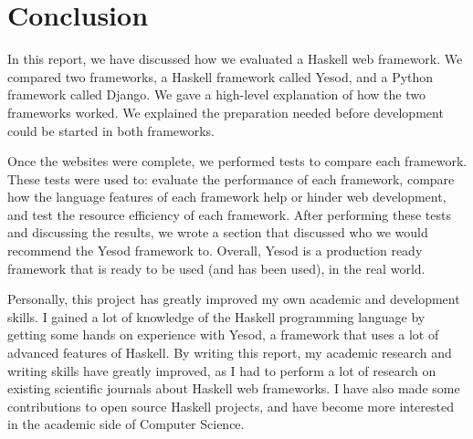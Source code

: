 \chapter{Conclusion}

In this report, we have discussed how we evaluated a
Haskell web framework. We compared two frameworks,
a Haskell framework called Yesod, and a Python
framework called Django. We gave a high-level explanation
of how the two frameworks worked. We explained the preparation
needed before development could be started in both frameworks.

Once the websites were complete, we performed tests to compare
each framework. These tests were used to: evaluate the performance
of each framework, compare how the language features
of each framework help or hinder web development, and test
the resource efficiency of each framework. After performing
these tests and discussing the results, we wrote a section
that discussed who we would recommend the Yesod framework
to. Overall, Yesod is a production ready framework that is
ready to be used (and has been used), in the real world.

Personally, this project has greatly improved my own academic and
development skills. I gained a lot of knowledge of the Haskell
programming language by getting some hands on experience with
Yesod, a framework that uses a lot of advanced features of Haskell.
By writing this report, my academic
research and writing skills have greatly improved, as I had to
perform a lot of research on existing scientific journals about
Haskell web frameworks.
I have also made some contributions to open source Haskell projects, and
have become more interested in the academic side of Computer
Science.
